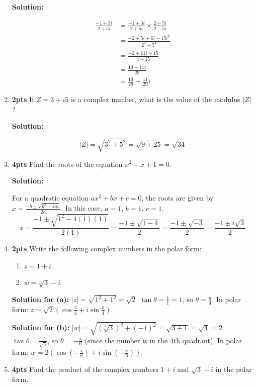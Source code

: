 \documentclass[nohyper,nobib,xcolor=dvipsnames,svgnames,x11names]{tufte-book}
\newenvironment{multiequation}{%
  \setlength{\abovedisplayskip}{3pt}      %
  \setlength{\belowdisplayskip}{6pt}      %
  \setlength{\abovedisplayshortskip}{3pt} %
  \setlength{\belowdisplayshortskip}{6pt} %
  \begin{equation}%
    \begin{aligned}%
}{%
    \end{aligned}%
  \end{equation}%
}
\begin{document}
\begin{enumerate}
\textbf{Solution:}    
    
    \begin{multiequation}
        \frac{-1+3i}{2+5i} &= \frac{-1+3i}{2+5i} \times \frac{2-5i}{2-5i} \\
        &= \frac{-2+5i+6i-15i^2}{2^2+5^2} \\
        &= \frac{-2+11i+15}{4+25} \\
        &= \frac{13+11i}{29} \\
        &= \frac{13}{29} + \frac{11}{29}i
    \end{multiequation}
    

    \item \textbf{2pts} If $Z=3+i5$ is a complex number, what is the value of the modulus $|Z|$?
    
    \textbf{Solution:}
    
    $$|Z| = \sqrt{3^2+5^2} = \sqrt{9+25} = \sqrt{34}$$

    \item \textbf{4pts} Find the roots of the equation $x^2+x+1=0$.

\textbf{Solution:}    
    
    For a quadratic equation $ax^2+bx+c=0$, the roots are given by $x=\frac{-b\pm\sqrt{b^2-4ac}}{2a}$.
    In this case, $a=1$, $b=1$, $c=1$.
    $$x = \frac{-1\pm\sqrt{1^2-4(1)(1)}}{2(1)} = \frac{-1\pm\sqrt{1-4}}{2} = \frac{-1\pm\sqrt{-3}}{2} = \frac{-1\pm i\sqrt{3}}{2}$$

    \item \textbf{2pts} Write the following complex numbers in the polar form:
    \begin{enumerate}
        \item $z=1+i$
        \item $w=\sqrt{3}-i$
    \end{enumerate}
    \textbf{Solution for (a):}
    $|z|=\sqrt{1^2+1^2}=\sqrt{2}$
    $\tan\theta = \frac{1}{1}=1$, so $\theta = \frac{\pi}{4}$.
    In polar form: $z=\sqrt{2}(\cos\frac{\pi}{4}+i\sin\frac{\pi}{4})$.

    \textbf{Solution for (b):}
    $|w|=\sqrt{(\sqrt{3})^2+(-1)^2}=\sqrt{3+1}=\sqrt{4}=2$
    $\tan\theta = \frac{-1}{\sqrt{3}}$, so $\theta = -\frac{\pi}{6}$ (since the number is in the 4th quadrant).
    In polar form: $w=2(\cos(-\frac{\pi}{6})+i\sin(-\frac{\pi}{6}))$.

    \item \textbf{4pts} Find the product of the complex numbers $1+i$ and $\sqrt{3}-i$ in the polar form.
    

\end{enumerate}
\end{document}
